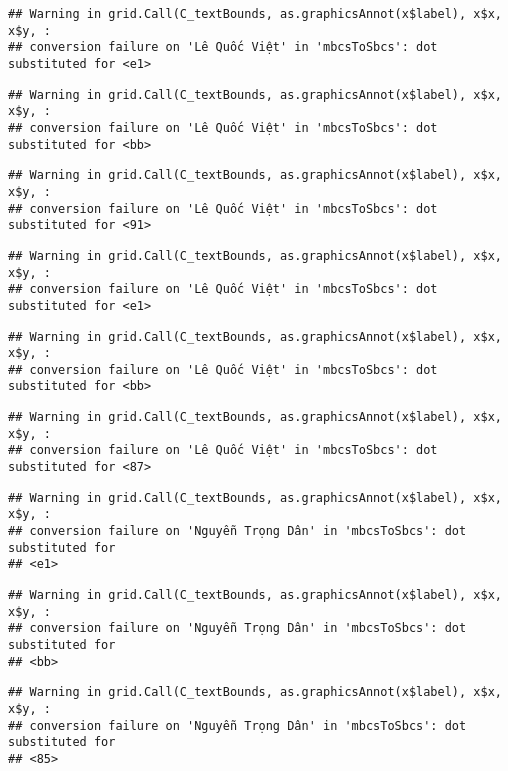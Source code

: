 \documentclass[
]{article}
\begin{document}
\begin{verbatim}
## Warning in grid.Call(C_textBounds, as.graphicsAnnot(x$label), x$x, x$y, :
## conversion failure on 'Lê Quốc Việt' in 'mbcsToSbcs': dot substituted for <e1>
\end{verbatim}

\begin{verbatim}
## Warning in grid.Call(C_textBounds, as.graphicsAnnot(x$label), x$x, x$y, :
## conversion failure on 'Lê Quốc Việt' in 'mbcsToSbcs': dot substituted for <bb>
\end{verbatim}

\begin{verbatim}
## Warning in grid.Call(C_textBounds, as.graphicsAnnot(x$label), x$x, x$y, :
## conversion failure on 'Lê Quốc Việt' in 'mbcsToSbcs': dot substituted for <91>
\end{verbatim}

\begin{verbatim}
## Warning in grid.Call(C_textBounds, as.graphicsAnnot(x$label), x$x, x$y, :
## conversion failure on 'Lê Quốc Việt' in 'mbcsToSbcs': dot substituted for <e1>
\end{verbatim}

\begin{verbatim}
## Warning in grid.Call(C_textBounds, as.graphicsAnnot(x$label), x$x, x$y, :
## conversion failure on 'Lê Quốc Việt' in 'mbcsToSbcs': dot substituted for <bb>
\end{verbatim}

\begin{verbatim}
## Warning in grid.Call(C_textBounds, as.graphicsAnnot(x$label), x$x, x$y, :
## conversion failure on 'Lê Quốc Việt' in 'mbcsToSbcs': dot substituted for <87>
\end{verbatim}

\begin{verbatim}
## Warning in grid.Call(C_textBounds, as.graphicsAnnot(x$label), x$x, x$y, :
## conversion failure on 'Nguyễn Trọng Dân' in 'mbcsToSbcs': dot substituted for
## <e1>
\end{verbatim}

\begin{verbatim}
## Warning in grid.Call(C_textBounds, as.graphicsAnnot(x$label), x$x, x$y, :
## conversion failure on 'Nguyễn Trọng Dân' in 'mbcsToSbcs': dot substituted for
## <bb>
\end{verbatim}

\begin{verbatim}
## Warning in grid.Call(C_textBounds, as.graphicsAnnot(x$label), x$x, x$y, :
## conversion failure on 'Nguyễn Trọng Dân' in 'mbcsToSbcs': dot substituted for
## <85>
\end{verbatim}
\end{document}
